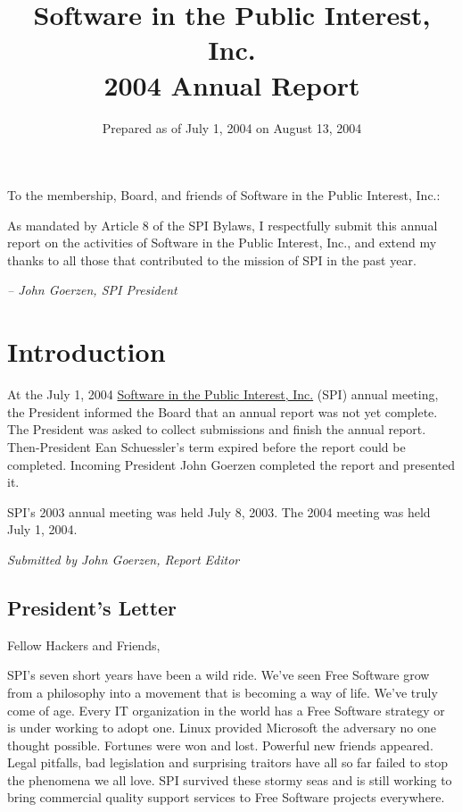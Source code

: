 \documentclass[letterpaper]{report}
\begin{document}
\title{Software in the Public Interest, Inc.\\
2004 Annual Report}
\date{Prepared as of July 1, 2004 on August 13, 2004}

\maketitle
To the membership, Board, and friends of Software in the Public Interest,
Inc.:

As mandated by Article 8 of the SPI Bylaws, I respectfully submit
this annual report on the activities of Software in the Public Interest,
Inc., and extend my thanks to all those that contributed to the mission
of SPI in the past year.

\emph{-- John Goerzen, SPI President}

\newpage

\tableofcontents

\newpage

\chapter{Introduction}

At the July 1, 2004 \href{http://www.spi-inc.org/}{Software in the Public Interest, Inc.}
(SPI) annual meeting, the President informed the Board that an annual
report was not yet complete. The President was asked to collect submissions
and finish the annual report. Then-President Ean Schuessler's term
expired before the report could be completed. Incoming President John
Goerzen completed the report and presented it.

SPI's 2003 annual meeting was held July 8, 2003. The 2004 meeting
was held July 1, 2004.

\emph{Submitted by John Goerzen, Report Editor}


\section{President's Letter}
\label{sec:president}

Fellow Hackers and Friends,

SPI's seven short years have been a wild ride. We've seen Free Software
grow from a philosophy into a movement that is becoming a way of life.
We've truly come of age. Every IT organization in the world has a
Free Software strategy or is under working to adopt one. Linux provided
Microsoft the adversary no one thought possible. Fortunes were won
and lost. Powerful new friends appeared. Legal pitfalls, bad legislation
and surprising traitors have all so far failed to stop the phenomena
we all love. SPI survived these stormy seas and is still working to
bring commercial quality support services to Free Software projects
everywhere.
\end{document}
